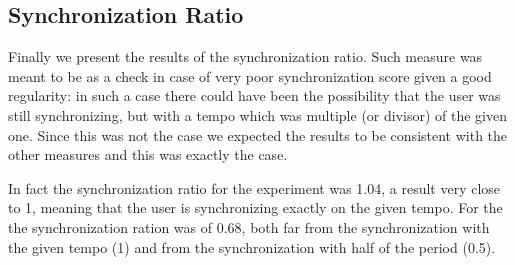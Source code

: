 \subsection{Synchronization Ratio}
Finally we present the results of the synchronization ratio. Such measure was meant to be as a check in case of very poor synchronization score given a good regularity: in such a case there could have been the possibility that the user was still synchronizing, but with a tempo which was multiple (or divisor) of the given one.
Since this was not the case we expected the results to be consistent with the other measures and this was exactly the case.

In fact the synchronization ratio for the \testfirst experiment was 1.04, a result very close to 1, meaning that the user is synchronizing exactly on the given tempo.
For the \testsecond the synchronization ration was of 0.68, both far from the synchronization with the given tempo (1) and from the synchronization with half of the period (0.5).
